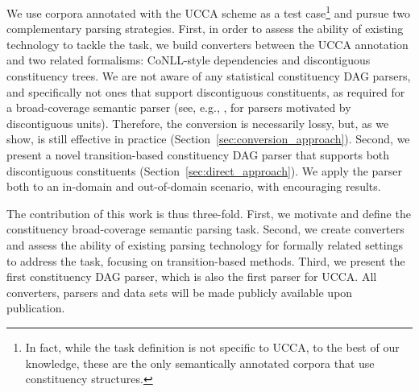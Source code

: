 \documentclass[11pt]{article}
\newcommand{\secref}[1]{Section~\ref{#1}}
\begin{document}
We use corpora annotated with the UCCA scheme \cite{abend2013universal} as a test
case\footnote{In fact, while the task definition is not specific to UCCA,
  to the best of our knowledge, these are the only
  semantically annotated corpora that use constituency structures.}
and pursue two complementary parsing strategies.
First, in order to assess the ability of existing technology to tackle the task,
we build converters between the UCCA annotation and two related formalisms:
CoNLL-style dependencies and discontiguous constituency trees.
We are not aware of any statistical constituency DAG parsers, and specifically not
ones that support discontiguous constituents, as required for a broad-coverage semantic
parser (see, e.g., \cite{pitler2015linear,maier2015discontinuous}, for parsers motivated by discontiguous units). Therefore, the conversion is necessarily lossy, but, as we show, is still effective
in practice (\secref{sec:conversion_approach}).
Second, we present a novel transition-based
constituency DAG parser that supports both discontiguous constituents (\secref{sec:direct_approach}). 
We apply the parser both to an in-domain and out-of-domain
scenario, with encouraging results.


The contribution of this work is thus three-fold.
First, we motivate and define the constituency broad-coverage semantic parsing task.
Second, we create converters and assess the ability of existing parsing technology
for formally related settings to address the task, focusing on transition-based methods.
Third, we present the first constituency DAG parser, which is also the
first parser for UCCA. 
All converters, parsers and data sets will be made publicly available upon publication.
\end{document}
